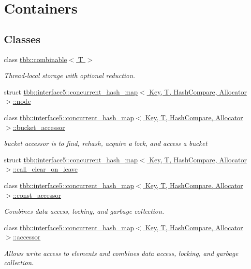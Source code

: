 \hypertarget{group__containers}{}\section{Containers}
\label{group__containers}
\subsection*{Classes}
\begin{DoxyCompactItemize}
\item 
class \hyperlink{classtbb_1_1combinable}{tbb\+::combinable$<$ T $>$}
\begin{DoxyCompactList}\small\item\em Thread-\/local storage with optional reduction. \end{DoxyCompactList}\item 
struct \hyperlink{structtbb_1_1interface5_1_1concurrent__hash__map_1_1node}{tbb\+::interface5\+::concurrent\+\_\+hash\+\_\+map$<$ Key, T, Hash\+Compare, Allocator $>$\+::node}
\item 
class \hyperlink{classtbb_1_1interface5_1_1concurrent__hash__map_1_1bucket__accessor}{tbb\+::interface5\+::concurrent\+\_\+hash\+\_\+map$<$ Key, T, Hash\+Compare, Allocator $>$\+::bucket\+\_\+accessor}
\begin{DoxyCompactList}\small\item\em bucket accessor is to find, rehash, acquire a lock, and access a bucket \end{DoxyCompactList}\item 
struct \hyperlink{structtbb_1_1interface5_1_1concurrent__hash__map_1_1call__clear__on__leave}{tbb\+::interface5\+::concurrent\+\_\+hash\+\_\+map$<$ Key, T, Hash\+Compare, Allocator $>$\+::call\+\_\+clear\+\_\+on\+\_\+leave}
\item 
class \hyperlink{classtbb_1_1interface5_1_1concurrent__hash__map_1_1const__accessor}{tbb\+::interface5\+::concurrent\+\_\+hash\+\_\+map$<$ Key, T, Hash\+Compare, Allocator $>$\+::const\+\_\+accessor}
\begin{DoxyCompactList}\small\item\em Combines data access, locking, and garbage collection. \end{DoxyCompactList}\item 
class \hyperlink{classtbb_1_1interface5_1_1concurrent__hash__map_1_1accessor}{tbb\+::interface5\+::concurrent\+\_\+hash\+\_\+map$<$ Key, T, Hash\+Compare, Allocator $>$\+::accessor}
\begin{DoxyCompactList}\small\item\em Allows write access to elements and combines data access, locking, and garbage collection. \end{DoxyCompactList}\item 

\end{DoxyCompactItemize}
